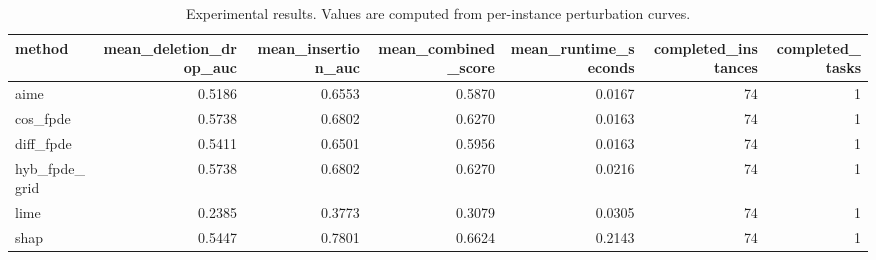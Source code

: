\begin{table}[t]
\caption{Experimental results. Values are computed from per-instance perturbation curves.}
\label{tab:main_results_computed}
\centering
\begin{tabular}{lrrrrrr}
\toprule
method & mean\_deletion\_drop\_auc & mean\_insertion\_auc & mean\_combined\_score & mean\_runtime\_seconds & completed\_instances & completed\_tasks \\
\midrule
aime & 0.5186 & 0.6553 & 0.5870 & 0.0167 & 74 & 1 \\
cos\_fpde & 0.5738 & 0.6802 & 0.6270 & 0.0163 & 74 & 1 \\
diff\_fpde & 0.5411 & 0.6501 & 0.5956 & 0.0163 & 74 & 1 \\
hyb\_fpde\_grid & 0.5738 & 0.6802 & 0.6270 & 0.0216 & 74 & 1 \\
lime & 0.2385 & 0.3773 & 0.3079 & 0.0305 & 74 & 1 \\
shap & 0.5447 & 0.7801 & 0.6624 & 0.2143 & 74 & 1 \\
\bottomrule
\end{tabular}

\end{table}
